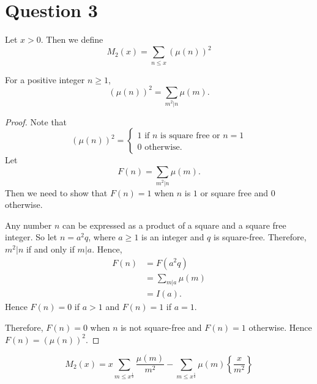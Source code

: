 \documentclass{unswmaths}
\begin{document}
\section*{Question 3}
\begin{definition}
    Let $x > 0$. Then we define
    \begin{equation*}
        M_2(x) = \sum_{n\leq x} (\mu(n))^2
    \end{equation*}
\end{definition}
\begin{lemma}
\label{M2Alt}
    For a positive integer $n \geq 1$,
    \begin{equation*}
        (\mu(n))^2 = \sum_{m^2|n} \mu(m).
    \end{equation*}
\end{lemma}
\begin{proof}
    Note that
    \begin{equation*}
        (\mu(n))^2 = \begin{cases}
            1\text{ if }n\text{ is square free or }n = 1\\
            0\text{ otherwise.}
        \end{cases}
    \end{equation*}
    Let 
    \begin{equation*}
        F(n) = \sum_{m^2|n} \mu(m).
    \end{equation*}
    Then we need to show that $F(n) = 1$ when $n$ is $1$ or square free 
    and $0$ otherwise.
    
    Any number $n$ can be expressed as a product of a square and a square
    free integer. So let $n = a^2q$, where $a \geq 1$ is an integer 
    and $q$ is square-free. Therefore,  $m^2|n$ if and only if $m|a$. Hence,
    \begin{align*}
        F(n) &= F(a^2q)\\
             &= \sum_{m|a}\mu(m)\\
             &= I(a).
    \end{align*}
    Hence $F(n) = 0$ if $a > 1$ and $F(n) = 1$ if $a = 1$.
    
    Therefore, $F(n) = 0$ when $n$ is not square-free and $F(n) = 1$ otherwise.
    Hence $F(n) = (\mu(n))^2$.
\end{proof}
\begin{lemma}
    \begin{equation*}
        M_2(x) = x\sum_{m\leq x^\frac{1}{2}} \frac{\mu(m)}{m^2}-\sum_{m\leq x^\frac{1}{2}}\mu(m)\left\{\frac{x}{m^2}\right\}
    \end{equation*}
\end{lemma}
\end{document}
